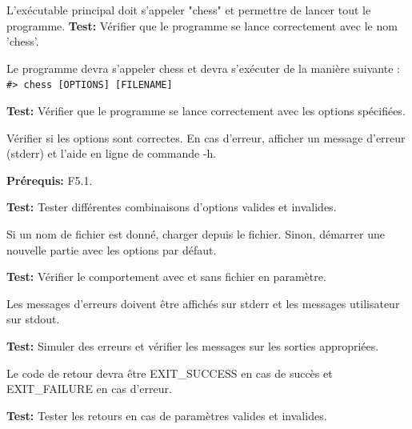 \documentclass{article}
\begin{document}
\begin{nonfunctionnalneedbox}
    L’exécutable principal doit s’appeler "chess" et permettre de lancer tout le programme.
    \textbf{Test:} Vérifier que le programme se lance correctement avec le nom 'chess'.
\end{nonfunctionnalneedbox}

\begin{needbox}
    \begin{subneedbox}
        Le programme devra s’appeler chess et devra s'exécuter de la manière suivante :  
        \texttt{\#> chess [OPTIONS] [FILENAME]}

        \textbf{Test:} Vérifier que le programme se lance correctement avec les options spécifiées.
    \end{subneedbox}
    
    \begin{subneedbox}
        Vérifier si les options sont correctes. En cas d'erreur, afficher un message d'erreur (stderr) et l’aide en ligne de commande -h.

        \textbf{Prérequis:} F5.1.

        \textbf{Test:} Tester différentes combinaisons d'options valides et invalides.
    \end{subneedbox}
    
    \begin{subneedbox}
        Si un nom de fichier est donné, charger depuis le fichier. Sinon, démarrer une nouvelle partie avec les options par défaut.

        \textbf{Test:} Vérifier le comportement avec et sans fichier en paramètre.
    \end{subneedbox}
    
    \begin{subneedbox}
        Les messages d’erreurs doivent être affichés sur stderr et les messages utilisateur sur stdout.

        \textbf{Test:} Simuler des erreurs et vérifier les messages sur les sorties appropriées.
    \end{subneedbox}
    
    \begin{subneedbox}
        Le code de retour devra être EXIT\_SUCCESS en cas de succès et EXIT\_FAILURE en cas d’erreur.

        \textbf{Test:} Tester les retours en cas de paramètres valides et invalides.
    \end{subneedbox}
\end{needbox}
\end{document}
